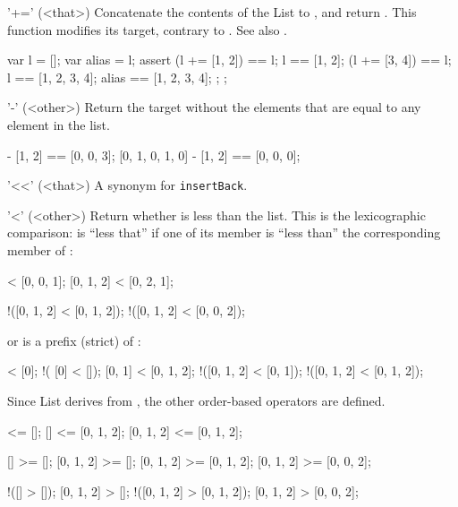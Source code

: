 \begin{urbiscriptapi}
\item['+='](<that>)%
  Concatenate the contents of the List  to \this, and return
  \this.  This function modifies its target, contrary to .  See
  also .

\begin{urbiscript}
{
  var l = [];
  var alias = l;
  assert
  {
    (l += [1, 2]) == l;
    l == [1, 2];
    (l += [3, 4]) == l;
    l == [1, 2, 3, 4];
    alias == [1, 2, 3, 4];
  };
};
\end{urbiscript}

\item['-'](<other>)%
  Return the target without the elements that are equal to any element
  in the  list.

\begin{urbiassert}
[0, 1, 0, 2, 3] - [1, 2] == [0, 0, 3];
[0, 1, 0, 1, 0] - [1, 2] == [0, 0, 0];
\end{urbiassert}

\item['<<'](<that>)%
  A synonym for \lstinline|insertBack|.

\item['<'](<other>)%
  Return whether \this is less than the  list.  This is the
  lexicographic comparison: \this is ``less that'' if one of its member is
  ``less than'' the corresponding member of :

\begin{urbiassert}
  [0, 0, 0] < [0, 0, 1];
  [0, 1, 2] < [0, 2, 1];

!([0, 1, 2] < [0, 1, 2]);
!([0, 1, 2] < [0, 0, 2]);
\end{urbiassert}

  \noindent
  or  is a prefix (strict) of \this:

\begin{urbiassert}
           [] < [0];          !(      [0] < []);
       [0, 1] < [0, 1, 2];    !([0, 1, 2] < [0, 1]);
  !([0, 1, 2] < [0, 1, 2]);
\end{urbiassert}

  Since List derives from , the other order-based
  operators are defined.

\begin{urbiassert}
        [] <= [];
        [] <= [0, 1, 2];
 [0, 1, 2] <= [0, 1, 2];

        [] >= [];
 [0, 1, 2] >= [];
 [0, 1, 2] >= [0, 1, 2];
 [0, 1, 2] >= [0, 0, 2];

       !([] > []);
  [0, 1, 2] > [];
!([0, 1, 2] > [0, 1, 2]);
  [0, 1, 2] > [0, 0, 2];
\end{urbiassert}
\end{urbiscriptapi}

